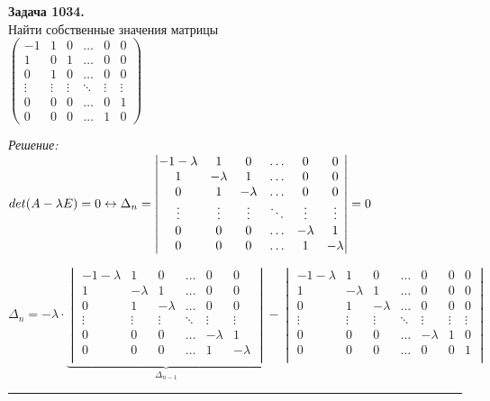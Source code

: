 \documentclass[a4paper, 12pt]{article}
\newenvironment{problem}[2][Задача]
{ \begin{mdframed}[backgroundcolor=gray!10] \textbf{#1 #2.} \\}
	{  \end{mdframed}}
\newenvironment{solution}
{\textit{Решение:}\vspace{.1cm}\\}
{\vspace{.1cm}\noindent\rule{7in}{1.5pt}}
\begin{document}
\begin{problem}{1034}
Найти собственные значения матрицы\\
$\left( \begin{array}{rrrrrr}-1 & 1 & 0 & \ldots & 0 & 0 \\ 1 & 0 & 1 & \ldots & 0 & 0 \\ 0 & 1 & 0 & \ldots & 0 & 0 \\ \vdots & \vdots & \vdots & \ddots & \vdots & \vdots \\ 0 & 0 & 0 & \ldots & 0 & 1 \\ 0 & 0 & 0 & \ldots & 1 & 0 \end{array} \right)$

\end{problem}
\begin{solution}
$
det(A-\lambda E) = 0 \leftrightarrow \Delta_n =
\begin{vmatrix}
	-1-\lambda & 1 & 0 & \ldots & 0 & 0 \\ 
	1 & -\lambda & 1 & \ldots & 0 & 0 \\ 
	0 & 1 & -\lambda & \ldots & 0 & 0 \\ 
	\vdots & \vdots & \vdots & \ddots & \vdots & \vdots 
	\\ 0 & 0 & 0 & \ldots & -\lambda & 1 \\ 
	0 & 0 & 0 & \ldots & 1 & -\lambda\\
\end{vmatrix}= 0\\
$

$
\Delta_n = -\lambda \cdot
\underbrace{
\begin{vmatrix}
	-1-\lambda & 1 & 0 & \ldots & 0 & 0 \\ 
	1 & -\lambda & 1 & \ldots & 0 & 0 \\ 
	0 & 1 & -\lambda & \ldots & 0 & 0 \\ 
	\vdots & \vdots & \vdots & \ddots & \vdots & \vdots 
	\\ 0 & 0 & 0 & \ldots & -\lambda & 1 \\ 
	0 & 0 & 0 & \ldots & 1 & -\lambda\\
\end{vmatrix}
}_{\Delta_{n-1}} -
\begin{vmatrix}
	-1-\lambda & 1 & 0 & \ldots & 0 & 0 & 0 \\ 
	1 & -\lambda & 1 & \ldots & 0 & 0 & 0 \\ 
	0 & 1 & -\lambda & \ldots & 0 & 0 & 0 \\ 
	\vdots & \vdots & \vdots & \ddots & \vdots & \vdots & \vdots\\
	0 & 0 & 0 & \ldots & -\lambda & 1 & 0 \\ 
	0 & 0 & 0 & \ldots & 0 & 0 & 1\\
\end{vmatrix}
$

\end{solution} 
\end{document}
